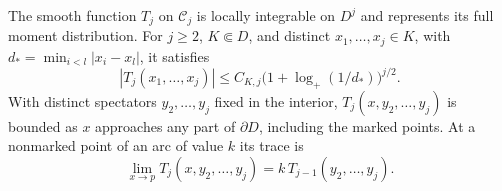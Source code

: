 \begin{lemma}
\label{lem:no-contact}
The smooth function $T_j$ on $\mathcal C_j$ is locally integrable on
$D^j$ and represents its full moment distribution. For $j\ge2$,
$K\Subset D$, and distinct $x_1,\ldots,x_j\in K$, with
$d_* =\min_{i<l}|x_i-x_l|$, it satisfies
\begin{equation}
 |T_j(x_1,\ldots,x_j)|
       \le C_{K,j}\bigl(1+\log_+(1/d_*)\bigr)^{j/2}.
 \label{eq:offdiagonal-log-bound}
\end{equation}
With distinct spectators $y_2,\ldots,y_j$ fixed in the interior,
$T_j(x,y_2,\ldots,y_j)$ is bounded as $x$ approaches any part of
$\partial D$, including the marked points. At a nonmarked point of
an arc of value $k$ its trace is
\begin{equation}
 \lim_{x\to p}T_j(x,y_2,\ldots,y_j)
                  =k\,T_{j-1}(y_2,\ldots,y_j).
 \label{eq:moment-boundary-trace}
\end{equation}
\end{lemma}

